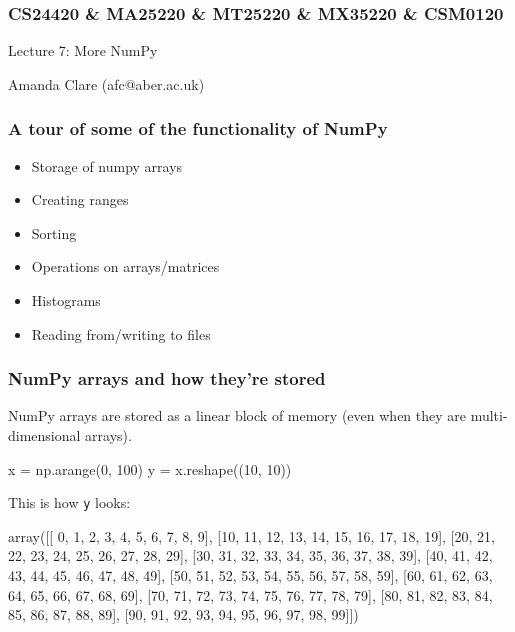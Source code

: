 \documentclass{beamer}
\begin{document}

\begin{frame}
\frametitle{CS24420 \& MA25220 \& MT25220 \& MX35220 \& CSM0120}

\begin{center}
\begin{huge}
Lecture 7: More NumPy
\end{huge}
\bigskip

Amanda Clare (afc@aber.ac.uk)

\end{center}
\end{frame}


\begin{frame}[fragile]
\frametitle{A tour of some of the functionality of NumPy}
\begin{itemize}
\item Storage of numpy arrays
\item Creating ranges
\item Sorting
\item Operations on arrays/matrices
\item Histograms
\item Reading from/writing to files
\end{itemize}
\end{frame}



\begin{frame}[fragile]
\frametitle{NumPy arrays and how they're stored}
NumPy arrays are stored as a linear block of memory (even when they
are multi-dimensional arrays).
\begin{code}
x = np.arange(0, 100)
y = x.reshape((10, 10))
\end{code}
This is how \texttt{y} looks:
\begin{code}
array([[ 0,  1,  2,  3,  4,  5,  6,  7,  8,  9],
       [10, 11, 12, 13, 14, 15, 16, 17, 18, 19],
       [20, 21, 22, 23, 24, 25, 26, 27, 28, 29],
       [30, 31, 32, 33, 34, 35, 36, 37, 38, 39],
       [40, 41, 42, 43, 44, 45, 46, 47, 48, 49],
       [50, 51, 52, 53, 54, 55, 56, 57, 58, 59],
       [60, 61, 62, 63, 64, 65, 66, 67, 68, 69],
       [70, 71, 72, 73, 74, 75, 76, 77, 78, 79],
       [80, 81, 82, 83, 84, 85, 86, 87, 88, 89],
       [90, 91, 92, 93, 94, 95, 96, 97, 98, 99]])
\end{code}
\end{frame}
\end{document}
